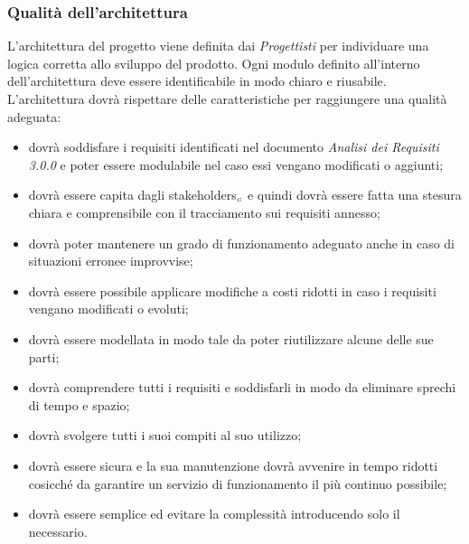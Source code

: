 \subsubsection{Qualità dell'architettura}\label{ProcessiPrimariProgettazioneQualitaArchitettura}
L'architettura del progetto viene definita dai \textit{Progettisti} per individuare una logica corretta allo sviluppo del prodotto. Ogni modulo definito all'interno dell'architettura deve essere identificabile in modo chiaro e riusabile.
L'architettura dovrà rispettare delle caratteristiche per raggiungere una qualità adeguata:
\begin{itemize}
	\item dovrà soddisfare i requisiti identificati nel documento \textit{Analisi dei Requisiti 3.0.0} e poter essere modulabile nel caso essi vengano modificati o aggiunti;
	\item dovrà essere capita dagli stakeholders$_{\scaleto{G}{3pt}}$ e quindi dovrà essere fatta una stesura chiara e comprensibile con il tracciamento sui requisiti annesso;
	\item dovrà poter mantenere un grado di funzionamento adeguato anche in caso di situazioni erronee improvvise;
	\item dovrà essere possibile applicare modifiche a costi ridotti in caso i requisiti vengano modificati o evoluti;
	\item dovrà essere modellata in modo tale da poter riutilizzare alcune delle sue parti;
	\item dovrà comprendere tutti i requisiti e soddisfarli in modo da eliminare sprechi di tempo e spazio;
	\item dovrà svolgere tutti i suoi compiti al suo utilizzo;
	\item dovrà essere sicura e la sua manutenzione dovrà avvenire in tempo ridotti cosicché da garantire un servizio di funzionamento il più continuo possibile;
	\item dovrà essere semplice ed evitare la complessità introducendo solo il necessario. %
\end{itemize}

